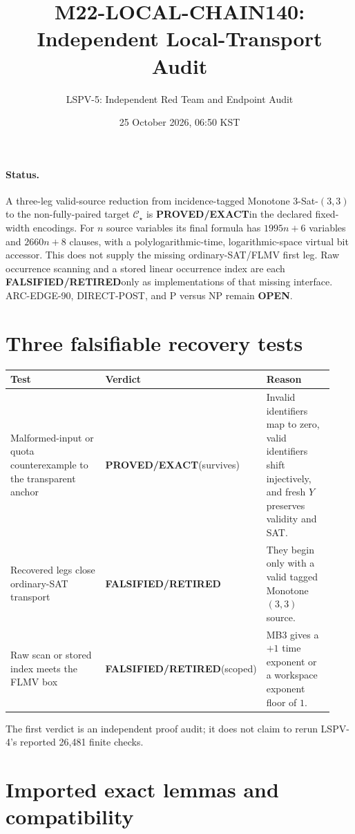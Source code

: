 \documentclass[11pt]{article}
\title{M22-LOCAL-CHAIN140: Independent Local-Transport Audit}
\author{LSPV-5: Independent Red Team and Endpoint Audit}
\date{25 October 2026, 06:50 KST}
\newcommand{\EXACT}{\textbf{PROVED/EXACT}}
\newcommand{\OPEN}{\textbf{OPEN}}
\newcommand{\RETIRED}{\textbf{FALSIFIED/RETIRED}}
\begin{document}
\maketitle

\paragraph{Status.}
A three-leg valid-source reduction from incidence-tagged Monotone
3-Sat-$(3,3)$ to the non-fully-paired target $\mathcal C_\star$ is
\EXACT in the declared fixed-width encodings.  For $n$ source variables its
final formula has $1995n+6$ variables and $2660n+8$ clauses, with a
polylogarithmic-time, logarithmic-space virtual bit accessor.  This does not
supply the missing ordinary-SAT/FLMV first leg.  Raw occurrence scanning and
a stored linear occurrence index are each \RETIRED only as implementations
of that missing interface.  ARC-EDGE-90, DIRECT-POST, and P versus NP remain
\OPEN.

\section{Three falsifiable recovery tests}

\begin{center}\small
\begin{tabular}{@{}p{0.44\linewidth}p{0.18\linewidth}p{0.31\linewidth}@{}}
\toprule
Test & Verdict & Reason\\ \midrule
Malformed-input or quota counterexample to the transparent anchor &
\EXACT (survives) & Invalid identifiers map to zero, valid identifiers
shift injectively, and fresh $Y$ preserves validity and SAT.\\
Recovered legs close ordinary-SAT transport & \RETIRED & They begin only
with a valid tagged Monotone $(3,3)$ source.\\
Raw scan or stored index meets the FLMV box & \RETIRED (scoped) & MB3 gives
a $+1$ time exponent or a workspace exponent floor of $1$.\\
\bottomrule
\end{tabular}
\end{center}

The first verdict is an independent proof audit; it does not claim to rerun
LSPV-4's reported 26,481 finite checks.

\section{Imported exact lemmas and compatibility}
\end{document}
